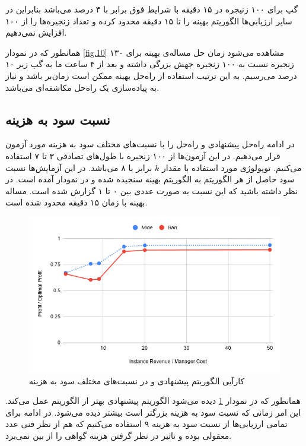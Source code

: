 گپ برای ۱۰۰ زنیجره در ۱۵ دقیقه با شرایط فوق برابر با ۴ درصد می‌باشد بنابراین
در سایر ارزیابی‌ها الگوریتم بهینه را تا ۱۵ دقیقه محدود کرده و تعداد زنجیره‌ها را از ۱۰۰ افزایش نمی‌دهیم.

همانطور که در نمودار \ref{fig.10} مشاهده می‌شود زمان حل مساله‌ی بهینه برای ۱۳۰ زنجیره نسبت به ۱۰۰ زنجیره جهش بزرگی داشته
و بعد از ۴ ساعت ما به گپ زیر ۱۰ درصد می‌رسیم.
به این ترتیب استفاده از راه‌حل بهینه ممکن است زمان‌بر باشد و نیاز به پیاده‌سازی یک راه‌حل مکاشفه‌ای می‌باشد.

\subsection{نسبت سود به هزینه}

در ادامه راه‌حل پیشنهادی و راه‌حل \cite{Bari2015} را با نسبت‌های مختلف سود به هزینه مورد آزمون قرار می‌دهیم. 
در این آزمون‌ها از ۱۰۰ زنجیره با طول‌های تصادفی ۳ تا ۷ استفاده می‌کنیم.
توپولوژی مورد استفاده
با مقدار \(k\)
برابر با ۸
می‌باشد.
در این آزمایش‌ها نسبت سود حاصل از هر الگوریتم به الگوریتم بهینه سنجیده شده و در نمودار آمده است.
در نظر داشته باشید که این نسبت به صورت عددی بین ۰ تا ۱ گزارش شده است.
مساله بهینه با زمان ۱۵ دقیقه محدود شده است.


\begin{figure}[h]
\center\includegraphics[scale=.5]{images/chart-1}
\caption{کارآیی الگوریتم پیشنهادی و \cite{Bari2015} در نسبت‌های مختلف سود به هزینه}
\label{fig.4}
\end{figure}

همانطور که در نمودار \ref{fig.4} دیده می‌شود الگوریتم پیشنهادی بهتر از الگوریتم \cite{Bari2015} عمل می‌کند.
این امر زمانی که نسبت سود به هزینه بزرگتر است بیشتر دیده می‌شود.
در ادامه برای تمامی ارزیابی‌ها از نسبت سود به هزینه ۹ استفاده می‌کنیم که هم از نظر فنی عدد معقولی بوده و تاثیر در نظر گرفتن هزینه گواهی را از بین نمی‌برد.


